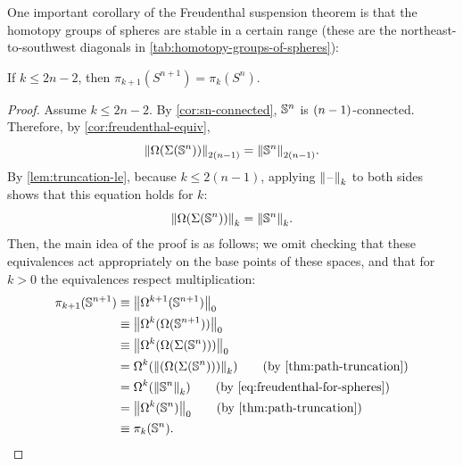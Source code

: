 %

%
%

%
%
%
One important corollary of the Freudenthal suspension theorem is that the homotopy groups of
spheres are stable in a certain range (these are the northeast-to-southwest diagonals
in \cref{tab:homotopy-groups-of-spheres}):

\begin{cor} \label{cor:stability-spheres}
If $k \le 2n-2$, then $\pi_{k+1}(S^{n+1}) = \pi_{k}(S^{n})$.
\end{cor}
\begin{proof}
Assume $k \le 2n-2$.
%
By \cref{cor:sn-connected}, $\Sn ^{n}$ is $\nminusone$-connected.  Therefore,
by \cref{cor:freudenthal-equiv},
\[
\trunc{2(n-1)}{\Omega(\susp(\Sn^{n}))} = \trunc{2(n-1)}{\Sn^{n}}.
\]
By \cref{lem:truncation-le}, because $k \le 2(n-1)$, applying $\trunc{k}{\blank}$
to both sides shows that this equation holds for $k$:
\begin{equation}\label{eq:freudenthal-for-spheres}
\trunc{k}{\Omega(\susp(\Sn^{n}))} = \trunc{k}{\Sn^{n}}.
\end{equation}
%
Then, the main idea of the proof is as follows; we omit checking that these
equivalences act appropriately on the base points of these spaces, and that for
$k > 0$ the equivalences respect multiplication:
%
\begin{align*}
\pi_{k+1}(\Sn^{n+1}) &\jdeq \trunc{0}{\Omega^{k+1}(\Sn^{n+1})} \\
                     &\jdeq \trunc{0}{\Omega^k(\Omega(\Sn^{n+1}))} \\
                     &\jdeq \trunc{0}{\Omega^k(\Omega(\susp(\Sn^{n})))} \\
                     &= \Omega^k(\trunc{k}{(\Omega(\susp(\Sn^{n})))})
                     \tag{by \cref{thm:path-truncation}}\\
                     &= \Omega^k(\trunc{k}{\Sn^{n}})
                     \tag{by \eqref{eq:freudenthal-for-spheres}}\\
                     &= \trunc{0}{\Omega^k(\Sn^{n})}
                     \tag{by \cref{thm:path-truncation}}\\
                     &\jdeq \pi_k(\Sn^{n}). \qedhere
\end{align*}
%
\end{proof}

